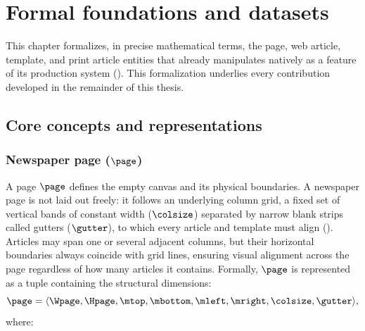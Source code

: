 \chapter{Formal foundations and datasets}
\label{chapter:definitions}


This chapter formalizes, in precise mathematical terms, the page, web article, template, and print article entities that \melody already manipulates natively as a feature of its production system (). This formalization underlies every contribution developed in the remainder of this thesis.

\section{Core concepts and representations}
\subsection{Newspaper page ($\page$)}
\label{sec:page-definition}

A page $\page$  defines the empty canvas and its physical boundaries. A newspaper page is not laid out freely: it follows an underlying column grid, a fixed set of vertical bands of constant width ($\colsize$) separated by narrow blank strips called gutters ($\gutter$), to which every article and template must align (). Articles may span one or several adjacent columns, but their horizontal boundaries always coincide with grid lines, ensuring visual alignment across the page regardless of how many articles it contains. Formally, $\page$ is represented as a tuple containing the structural dimensions:
\begin{equation}
\page = \langle \Wpage, \Hpage, \mtop, \mbottom, \mleft, \mright, \colsize, \gutter \rangle,
\label{eq:page-definition}
\end{equation}
where:

